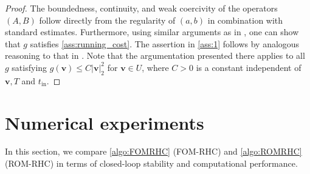 \documentclass{m2an}
\newcommand{\bv}{\mathbf{v}}
\newcommand{\tint}{t_{\mathrm{in}}}
\newcommand{\norm}[2]{\left|#1\right|_{#2}}
\begin{document}
%
\begin{proof}
    The boundedness, continuity, and weak coercivity of the operators \( (A, B) \) follow directly from the regularity of \( (a, b) \) in combination with standard estimates. Furthermore, using similar arguments as in \cite[Section~4.1]{azmi2019hybrid}, one can show that \( g \) satisfies \cref{ass:running_cost}. The assertion in \cref{ass:1} follows by analogous reasoning to that in \cite[Proposition~6.1]{azmi2019hybrid}. Note that the argumentation presented there applies to all \( g \) satisfying \( g(\bv) \leq C \norm{\bv}{2}^2 \) for \( \bv \in U \), where \( C > 0 \) is a constant independent of  \({\bv}, T \) and \( \tint \).
\end{proof}
%
\section{Numerical experiments}\label{sec:NUMEXP}
%
In this section, we compare \cref{algo:FOMRHC} (FOM-RHC) and \cref{algo:ROMRHC} (ROM-RHC) in terms of closed-loop stability and computational performance. 
%
\end{document}
